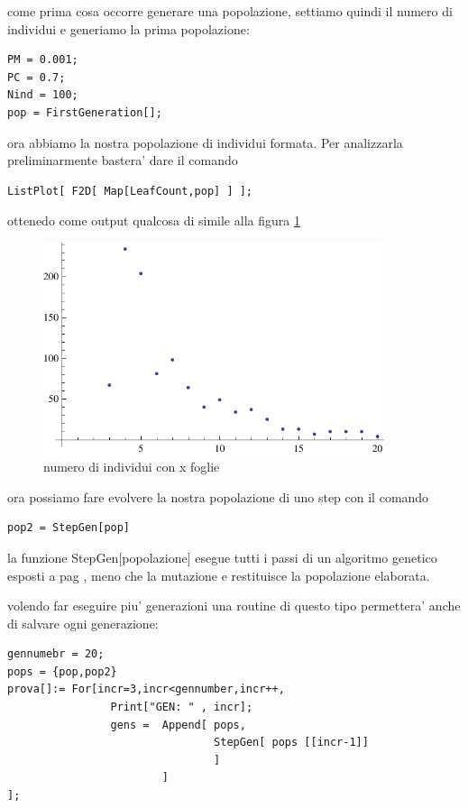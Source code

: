 \documentclass[12pt, a4paper]{article}
\begin{document}
come prima cosa occorre generare una popolazione, settiamo quindi il numero di individui e generiamo la prima popolazione:
\begin{lstlisting}
PM = 0.001;
PC = 0.7;
Nind = 100;
pop = FirstGeneration[];
\end{lstlisting}

ora abbiamo la nostra popolazione di individui formata. Per analizzarla preliminarmente bastera' dare il comando
\lstset{caption=,label=}
\begin{lstlisting}
ListPlot[ F2D[ Map[LeafCount,pop] ] ];
\end{lstlisting}

ottenedo come output qualcosa di simile alla figura \ref{figure:leafcount}

\begin{figure}[!h]
\begin{center}
\includegraphics[width=10.0cm]{leafcountlistplot.pdf}
\caption{numero di individui con x foglie}
\label{figure:leafcount}
\end{center}
\end{figure}

ora possiamo fare evolvere la nostra popolazione di uno step con il comando
\begin{lstlisting}
pop2 = StepGen[pop]
\end{lstlisting}
la funzione StepGen[popolazione] esegue tutti i passi di un algoritmo genetico esposti a pag \pageref{sec:intro}, meno che la mutazione e restituisce la popolazione elaborata.

volendo far eseguire piu' generazioni una routine di questo tipo permettera' anche di salvare ogni generazione:
\begin{lstlisting}
gennumebr = 20;
pops = {pop,pop2}
prova[]:= For[incr=3,incr<gennumber,incr++,
				Print["GEN: " , incr];
				gens = 	Append[	pops,
								StepGen[ pops [[incr-1]] 
								] 
						]
];
\end{lstlisting}
\end{document}
